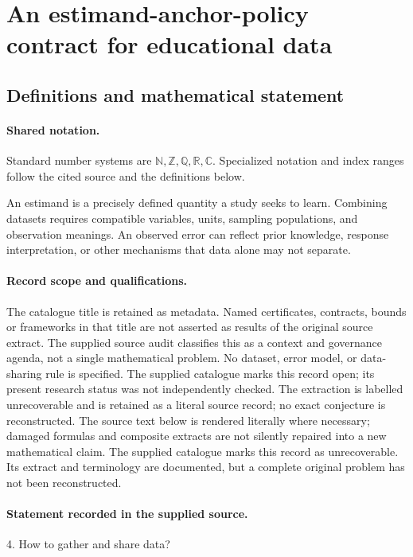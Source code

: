 \documentclass[11pt]{article}
\begin{document}
\section{An estimand-anchor-policy contract for educational data}\label{statement}

\subsection{Definitions and mathematical statement}

\paragraph{Shared notation.}Standard number systems are $\mathbb N,\mathbb Z,\mathbb Q,\mathbb R,\mathbb C$. Specialized notation and index ranges follow the cited source and the definitions below.


An estimand is a precisely defined quantity a study seeks to learn. Combining datasets requires compatible variables, units, sampling populations, and observation meanings. An observed error can reflect prior knowledge, response interpretation, or other mechanisms that data alone may not separate.
\paragraph{Record scope and qualifications.}
The catalogue title is retained as metadata. Named certificates, contracts, bounds or frameworks in that title are not asserted as results of the original source extract.
The supplied source audit classifies this as a context and governance agenda, not a single mathematical problem. No dataset, error model, or data-sharing rule is specified. The supplied catalogue marks this record open; its present research status was not independently checked. The extraction is labelled unrecoverable and is retained as a literal source record; no exact conjecture is reconstructed.
The source text below is rendered literally where necessary; damaged formulas and composite extracts are not silently repaired into a new mathematical claim.
The supplied catalogue marks this record as unrecoverable. Its extract and terminology are documented, but a complete original problem has not been reconstructed.
\paragraph{Statement recorded in the supplied source.}
4. How to gather and share data?
\end{document}
